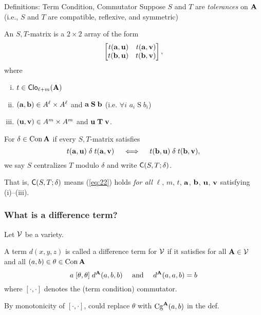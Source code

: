 \documentclass[12pt,xcolor=dvipsnames%
   ]{beamer}
\renewcommand{\defn}[1]{\alert{#1}}
\newcommand{\defin}[1]{\alert{#1}}
\begin{document}
\begin{frame}{Definitions: Term Condition, Commutator}
  Suppose $S$ and $T$ are \emph{tolerances} on $\mathbf{A}$\\[4pt]
  {\small (i.e., $S$ and $T$ are compatible, reflexive, and symmetric)}

  \pause
  An \defin{$S,T$-matrix} is a $2\times 2$ array of the form
  \[
  \begin{bmatrix*}[r] t(\ba,\bu) & t(\ba,\bv)\\ t(\bb,\bu)&t(\bb,\bv)\end{bmatrix*},
  \]
  where 
  \begin{enumerate}[(i)] %
  \item $t\in \operatorname{\mathsf{Clo}}_{\ell + m}(\mathbf{A})$
  \item $(\mathbf{a}, \mathbf{b})\in A^\ell\times A^\ell$ and $\mathbf{a} \mathrel{\mathbf{S}} \mathbf{b}$
    (i.e. $\forall i$ $a_i \mathrel{S} b_i$)
  \item $(\mathbf{u}, \mathbf{v})\in A^m\times A^m$ and $\mathbf{u} \mathrel{\mathbf{T}} \mathbf{v}$.
  \end{enumerate}

  \pause
  For $\delta \in \operatorname{Con}\mathbf{A}$ if every $S,T$-matrix satisfies
  \begin{equation}
    \label{eq:22}
    t(\mathbf{a},\mathbf{u}) \mathrel{\delta} t(\mathbf{a},\mathbf{v})\quad \iff \quad t(\mathbf{b},\mathbf{u}) \mathrel{\delta} t(\mathbf{b},\mathbf{v}),
  \end{equation}
  we say \defin{$S$ centralizes $T$ modulo $\delta$} and write 
  $\mathsf{C}(S, T; \delta)$.

  That is, $\mathsf{C}(S, T; \delta)$  means
  (\ref{eq:22}) holds \emph{for all}
  $\ell$, $m$, $t$, $\mathbf{a}$, $\mathbf{b}$, $\mathbf{u}$, $\mathbf{v}$ satisfying (i)--(iii).
\end{frame}












  \begin{frame}
\frametitle{What is a difference term?}
Let $\mathcal{V}$ be a variety. %

A term $d(x,y,z)$ is called a \alert{difference term} for $\mathcal{V}$ 
if it satisfies for all $\mathbf{A} \in \mathcal{V}$ and all $(a,b) \in \theta\in \operatorname{Con}\mathbf{A}$
\begin{equation}
\label{eq:3}  
a \mathrel{[\theta, \theta]} d^{\mathbf{A}}(a,b,b) 
\quad \text{ and } \quad
d^{\mathbf{A}}(a,a,b) = b 
\end{equation}
where $[\cdot, \cdot]$ denotes the (term condition) commutator.

\pause

By monotonicity of $[\cdot, \cdot]$, could replace $\theta$ 
with $\operatorname{Cg}^{\mathbf{A}}(a,b)$ in the def.


\end{frame}
\end{document}
